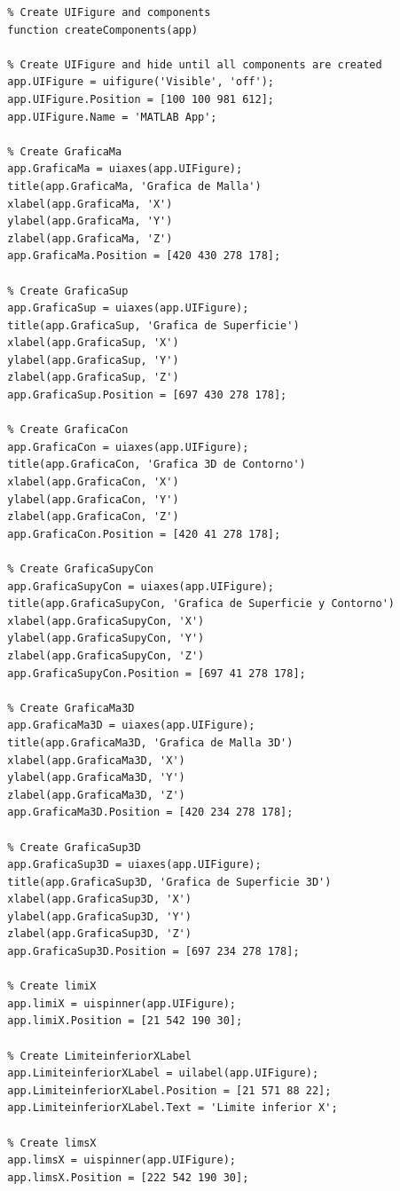 \documentclass{article}
\begin{document}
\begin{lstlisting}
		% Create UIFigure and components
		function createComponents(app)
		
		% Create UIFigure and hide until all components are created
		app.UIFigure = uifigure('Visible', 'off');
		app.UIFigure.Position = [100 100 981 612];
		app.UIFigure.Name = 'MATLAB App';
		
		% Create GraficaMa
		app.GraficaMa = uiaxes(app.UIFigure);
		title(app.GraficaMa, 'Grafica de Malla')
		xlabel(app.GraficaMa, 'X')
		ylabel(app.GraficaMa, 'Y')
		zlabel(app.GraficaMa, 'Z')
		app.GraficaMa.Position = [420 430 278 178];
		
		% Create GraficaSup
		app.GraficaSup = uiaxes(app.UIFigure);
		title(app.GraficaSup, 'Grafica de Superficie')
		xlabel(app.GraficaSup, 'X')
		ylabel(app.GraficaSup, 'Y')
		zlabel(app.GraficaSup, 'Z')
		app.GraficaSup.Position = [697 430 278 178];
		
		% Create GraficaCon
		app.GraficaCon = uiaxes(app.UIFigure);
		title(app.GraficaCon, 'Grafica 3D de Contorno')
		xlabel(app.GraficaCon, 'X')
		ylabel(app.GraficaCon, 'Y')
		zlabel(app.GraficaCon, 'Z')
		app.GraficaCon.Position = [420 41 278 178];
		
		% Create GraficaSupyCon
		app.GraficaSupyCon = uiaxes(app.UIFigure);
		title(app.GraficaSupyCon, 'Grafica de Superficie y Contorno')
		xlabel(app.GraficaSupyCon, 'X')
		ylabel(app.GraficaSupyCon, 'Y')
		zlabel(app.GraficaSupyCon, 'Z')
		app.GraficaSupyCon.Position = [697 41 278 178];
		
		% Create GraficaMa3D
		app.GraficaMa3D = uiaxes(app.UIFigure);
		title(app.GraficaMa3D, 'Grafica de Malla 3D')
		xlabel(app.GraficaMa3D, 'X')
		ylabel(app.GraficaMa3D, 'Y')
		zlabel(app.GraficaMa3D, 'Z')
		app.GraficaMa3D.Position = [420 234 278 178];
		
		% Create GraficaSup3D
		app.GraficaSup3D = uiaxes(app.UIFigure);
		title(app.GraficaSup3D, 'Grafica de Superficie 3D')
		xlabel(app.GraficaSup3D, 'X')
		ylabel(app.GraficaSup3D, 'Y')
		zlabel(app.GraficaSup3D, 'Z')
		app.GraficaSup3D.Position = [697 234 278 178];
		
		% Create limiX
		app.limiX = uispinner(app.UIFigure);
		app.limiX.Position = [21 542 190 30];
		
		% Create LimiteinferiorXLabel
		app.LimiteinferiorXLabel = uilabel(app.UIFigure);
		app.LimiteinferiorXLabel.Position = [21 571 88 22];
		app.LimiteinferiorXLabel.Text = 'Limite inferior X';
		
		% Create limsX
		app.limsX = uispinner(app.UIFigure);
		app.limsX.Position = [222 542 190 30];
		

\end{lstlisting}
\end{document}
